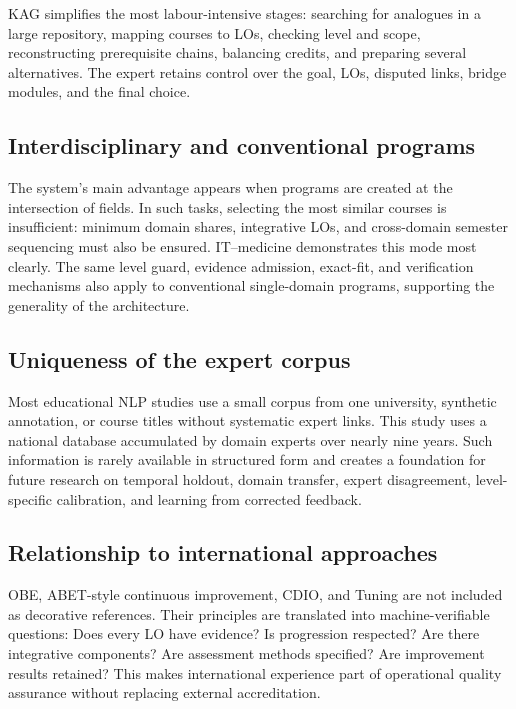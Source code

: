 \documentclass[twoside,11pt]{article}
\begin{document}
KAG simplifies the most labour-intensive stages: searching for analogues in a large repository, mapping courses to LOs, checking level and scope, reconstructing prerequisite chains, balancing credits, and preparing several alternatives. The expert retains control over the goal, LOs, disputed links, bridge modules, and the final choice.

\subsection{Interdisciplinary and conventional programs}

The system's main advantage appears when programs are created at the intersection of fields. In such tasks, selecting the most similar courses is insufficient: minimum domain shares, integrative LOs, and cross-domain semester sequencing must also be ensured. IT--medicine demonstrates this mode most clearly. The same level guard, evidence admission, exact-fit, and verification mechanisms also apply to conventional single-domain programs, supporting the generality of the architecture.

\subsection{Uniqueness of the expert corpus}

Most educational NLP studies use a small corpus from one university, synthetic annotation, or course titles without systematic expert links. This study uses a national database accumulated by domain experts over nearly nine years. Such information is rarely available in structured form and creates a foundation for future research on temporal holdout, domain transfer, expert disagreement, level-specific calibration, and learning from corrected feedback.

\subsection{Relationship to international approaches}

OBE, ABET-style continuous improvement, CDIO, and Tuning are not included as decorative references. Their principles are translated into machine-verifiable questions: Does every LO have evidence? Is progression respected? Are there integrative components? Are assessment methods specified? Are improvement results retained? This makes international experience part of operational quality assurance without replacing external accreditation.
\end{document}
